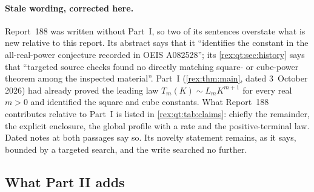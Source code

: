 \paragraph{Stale wording, corrected here.} Report~188 was written without
Part~I, so two of its sentences overstate what is new relative to this
report. Its abstract says that it ``identifies the constant in the
all-real-power conjecture recorded in OEIS A082528''; its
\cref{rex:qt:sec:history} says that ``targeted source checks found no
directly matching square- or cube-power theorem among the inspected
material''. Part~I (\cref{rex:thm:main}, dated 3~October 2026) had already
proved the leading law $T_m(K)\sim L_mK^{m+1}$ for every real $m>0$ and
identified the square and cube constants. What Report~188 contributes
relative to Part~I is listed in \cref{rex:qt:tab:claims}: chiefly the
remainder, the explicit enclosure, the global profile with a rate and the
positive-terminal law. Dated notes at both passages say so. Its novelty
statement remains, as it says, bounded by a targeted search, and the write
searched no further.

\subsection{What Part II adds}\label{rex:qt:sec:adds}

